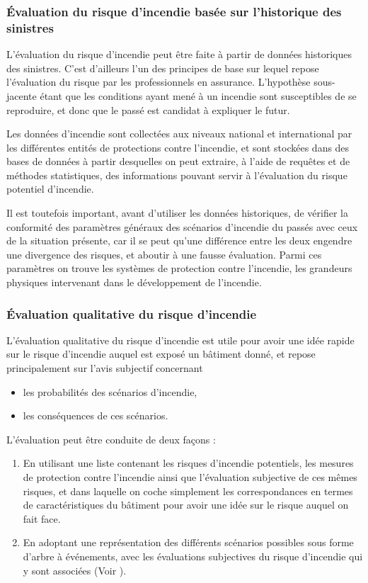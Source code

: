 \documentclass[11pt]{article}
\begin{document}
\subsubsection{Évaluation du risque d'incendie basée sur l'historique des sinistres}

L'évaluation du risque d'incendie peut être faite à partir de données historiques des sinistres. C'est d'ailleurs l'un des principes de base sur lequel repose l'évaluation du risque par les professionnels en assurance. L'hypothèse sous-jacente étant que les conditions ayant mené à un incendie sont susceptibles de se reproduire, et donc que le passé est candidat à expliquer le futur. 

Les données d'incendie sont collectées aux niveaux national et international par les différentes entités de protections contre l'incendie, et sont stockées dans des bases de données à partir desquelles on peut extraire, à l'aide de requêtes et de méthodes statistiques, des informations pouvant servir à l'évaluation du risque potentiel d'incendie.

Il est toutefois important, avant d'utiliser les données historiques, de vérifier la conformité des paramètres généraux des scénarios d'incendie du passés avec ceux de la situation présente, car il se peut qu'une différence entre les deux engendre une divergence des risques, et aboutir à une fausse évaluation. Parmi ces paramètres on trouve les systèmes de protection contre l'incendie, les grandeurs physiques intervenant dans le développement de l'incendie. 

\subsubsection{Évaluation qualitative du risque d'incendie}

L'évaluation qualitative du risque d'incendie est utile pour avoir une idée rapide sur le risque d'incendie auquel est exposé un bâtiment donné, et repose principalement sur l'avis subjectif concernant
\begin{itemize}
\item les probabilités des scénarios d'incendie,
\item les conséquences de ces scénarios.
\end{itemize}

L'évaluation peut être conduite de deux façons :
\begin{enumerate}
\item En utilisant une liste contenant les risques d'incendie potentiels, les mesures de protection contre l'incendie ainsi que l'évaluation subjective de ces mêmes risques, et dans laquelle on coche simplement les correspondances en termes de caractéristiques du bâtiment pour avoir une idée sur le risque auquel on fait face.
\item En adoptant une représentation des différents scénarios possibles sous forme d'arbre à événements, avec les évaluations subjectives du risque d'incendie qui y sont associées (Voir \cite{national2007nfpa}).
\end{enumerate}
\end{document}
